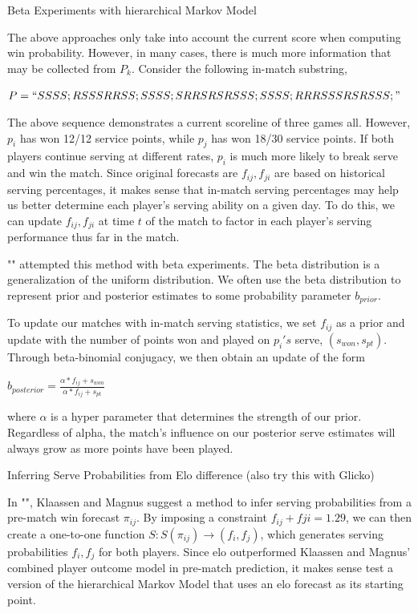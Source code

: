 \documentclass[11pt]{article}
\begin{document}
\item Beta Experiments with hierarchical Markov Model

The above approaches only take into account the current score when computing win probability. However, in many cases, there is much more information that may be collected from $P_k$. Consider the following in-match substring, 

$P=``SSSS;RSSSRRSS;SSSS;SRRSRSRSSS;SSSS;RRRSSSRSRSSS;"$

The above sequence demonstrates a current scoreline of three games all. However, $p_i$ has won 12/12 service points, while $p_j$ has won 18/30 service points. If both players continue serving at different rates, $p_i$ is much more likely to break serve and win the match. Since original forecasts are $f_{ij},f_{ji}$ are based on historical serving percentages, it makes sense that in-match serving percentages may help us better determine each player's serving ability on a given day. To do this, we can update $f_{ij},f_{ji}$ at time $t$ of the match to factor in each player's serving performance thus far in the match.

"" attempted this method with beta experiments. The beta distribution is a generalization of the uniform distribution. We often use the beta distribution to represent prior and posterior estimates to some probability parameter $b_{prior}$.

To update our matches with in-match serving statistics, we set $f_{ij}$ as a prior and update with the number of points won and played on $p_i's$ serve, $(s_{won},s_{pt})$. Through beta-binomial conjugacy, we then obtain an update of the form 

$b_{posterior} = \frac{\alpha * f_{ij}+ s_{won}}{\alpha * f_{ij} + s_{pt}}$

where $\alpha$ is a hyper parameter that determines the strength of our prior. Regardless of alpha, the match's influence on our posterior serve estimates will always grow as more points have been played.
 
\item Inferring Serve Probabilities from Elo difference (also try this with Glicko)

In "", Klaassen and Magnus suggest a method to infer serving probabilities from a pre-match win forecast $\pi_{ij}$. By imposing a constraint $f_{ij}+f{ji}=1.29$, we can then create a one-to-one function 
$S: S(\pi_{ij}) \rightarrow (f_i,f_j)$, which generates serving probabilities $f_i,f_j$ for both players. Since elo outperformed Klaassen and Magnus' combined player outcome model in pre-match prediction, it makes sense test a version of the hierarchical Markov Model that uses an elo forecast as its starting point.
\end{document}
